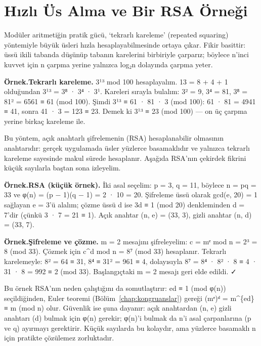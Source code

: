 \section{Hızlı Üs Alma ve Bir RSA Örneği}

Modüler aritmetiğin pratik gücü, ‘tekrarlı kareleme’ (repeated squaring) yöntemiyle büyük üsleri hızla hesaplayabilmesinde ortaya çıkar. Fikir basittir: üssü ikili tabanda düşünüp tabanın karelerini birbiriyle çarparız; böylece n’inci kuvvet için n çarpma yerine yalnızca log₂n dolayında çarpma yeter.

\begin{tcolorbox}[bookbox,colback=cEx]\textbf{\textsf{\textcolor{cAcc}{Örnek.}}}\quad \textbf{Tekrarlı kareleme. }3¹³ mod 100 hesaplayalım. 13 = 8 + 4 + 1 olduğundan 3¹³ = 3⁸ · 3⁴ · 3¹. Kareleri sırayla bulalım: 3² = 9, 3⁴ = 81, 3⁸ = 81² = 6561 ≡ 61 (mod 100). Şimdi 3¹³ ≡ 61 · 81 · 3 (mod 100): 61 · 81 = 4941 ≡ 41, sonra 41 · 3 = 123 ≡ 23. Demek ki 3¹³ ≡ 23 (mod 100) — on üç çarpma yerine birkaç kareleme ile.\end{tcolorbox}

Bu yöntem, açık anahtarlı şifrelemenin (RSA) hesaplanabilir olmasının anahtarıdır: gerçek uygulamada üsler yüzlerce basamaklıdır ve yalnızca tekrarlı kareleme sayesinde makul sürede hesaplanır. Aşağıda RSA’nın çekirdek fikrini küçük sayılarla baştan sona izleyelim.

\begin{tcolorbox}[bookbox,colback=cEx]\textbf{\textsf{\textcolor{cAcc}{Örnek.}}}\quad \textbf{RSA (küçük örnek). }İki asal seçelim: p = 3, q = 11, böylece n = pq = 33 ve φ(n) = (p − 1)(q − 1) = 2 · 10 = 20. Şifreleme üssü olarak gcd(e, 20) = 1 sağlayan e = 3’ü alalım; çözme üssü d ise 3d ≡ 1 (mod 20) denkleminden d = 7’dir (çünkü 3 · 7 = 21 ≡ 1). Açık anahtar (n, e) = (33, 3), gizli anahtar (n, d) = (33, 7).\end{tcolorbox}

\begin{tcolorbox}[bookbox,colback=cEx]\textbf{\textsf{\textcolor{cAcc}{Örnek.}}}\quad \textbf{Şifreleme ve çözme. }m = 2 mesajını şifreleyelim: c = mᵉ mod n = 2³ = 8 (mod 33). Çözmek için c\textasciicircum{}d mod n = 8⁷ (mod 33) hesaplanır. Tekrarlı karelemeyle: 8² = 64 ≡ 31, 8⁴ ≡ 31² = 961 ≡ 4, dolayısıyla 8⁷ = 8⁴ · 8² · 8 ≡ 4 · 31 · 8 = 992 ≡ 2 (mod 33). Başlangıçtaki m = 2 mesajı geri elde edildi. ✓\end{tcolorbox}

Bu örnek RSA’nın neden çalıştığını da somutlaştırır: ed ≡ 1 (mod φ(n)) seçildiğinden, Euler teoremi (Bölüm~\ref{chap:kongruanslar}) gereği (mᵉ)ᵈ = m\textasciicircum{}\{ed\} ≡ m (mod n) olur. Güvenlik ise şuna dayanır: açık anahtardan (n, e) gizli anahtarı (d) bulmak için φ(n) gerekir; φ(n)’i bulmak da n’i asal çarpanlarına (p ve q) ayırmayı gerektirir. Küçük sayılarda bu kolaydır, ama yüzlerce basamaklı n için pratikte çözülemez zorluktadır.

